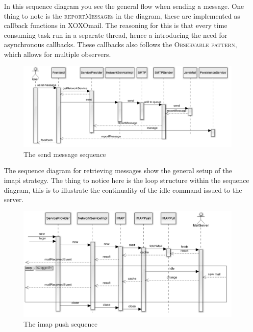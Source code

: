 	In this sequence diagram you see the general flow when sending a message. One thing to note is the \textsc{reportMessage}s in the diagram, these are implemented as callback functions in XOXOmail. The reasoning for this is that every time consuming task run in a separate thread, hence a introducing the need for asynchronous callbacks. These callbacks also follows the \textsc{Observable pattern}\cite{bib:observer}, which allows for multiple observers. 
	\begin{figure}[H]
		\includegraphics[width=\textwidth]{SendSequence}
		\caption{The send message sequence}
		\label{fig:lifecycle}
	\end{figure}
	The sequence diagram for retrieving messages show the general setup of the \gls{imapi} strategy. The thing to notice here is the loop structure within the sequence diagram, this is to illustrate the continuality of the idle command issued to the server. 
	\begin{figure}[H]
		\includegraphics[width=\textwidth]{IMAPPushSequence}
		\caption{The imap push sequence}
		\label{fig:lifecycle}
	\end{figure}
	